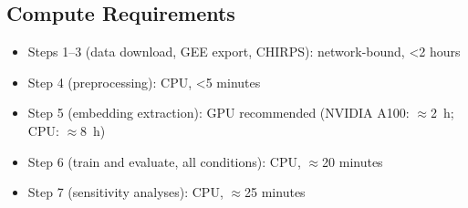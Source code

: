 \documentclass[journal]{IEEEtran}
\begin{document}
\subsection{Compute Requirements}

\begin{itemize}
  \item Steps 1--3 (data download, GEE export, CHIRPS): network-bound, \textless 2 hours
  \item Step 4 (preprocessing): CPU, \textless 5 minutes
  \item Step 5 (embedding extraction): GPU recommended (NVIDIA A100: $\approx$2~h;
        CPU: $\approx$8~h)
  \item Step 6 (train and evaluate, all conditions): CPU, $\approx$20 minutes
  \item Step 7 (sensitivity analyses): CPU, $\approx$25 minutes
\end{itemize}



\end{document}
